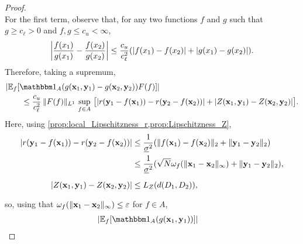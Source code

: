 \documentclass[12pt]{report}
\begin{document}
\begin{proof}
\begin{equation}
    \end{equation}
    For the first term, observe that, for any two functions $f$ and $g$ such that $g \ge c_\ell > 0$ and $f, g \le c_u < \infty$,
    \begin{equation}
        \abs*{
            \frac{f(x_1)}{g(x_1)}
            -
            \frac{f(x_2)}{g(x_2)}
        }
        \le \frac{c_u}{c_\ell^2}\parens*{
            \abs{f(x_1) - f(x_2)}
            + \abs{g(x_1) - g(x_2)}
        }.
    \end{equation}
    Therefore, taking a supremum,
    \begin{align}
        &\abs{\E_f\sbrac{
            \ind_A\parens{
                g(\vx_1, \vy_1)
                - g(\vx_2, \vy_2)
            }
            F(f)
        }} \\
        &\qquad\le 
            \frac{c_u}{c_\ell^2}
            \,
            \norm{F(f)}_{L^1}
            \,
            \sup_{f \in A}
            \,\big[
                \abs{
                    r(\vy_1 - f(\vx_1))
                    - r(\vy_2 - f(\vx_2))
                }
                + \abs{Z(\vx_1, \vy_1) - Z(\vx_2, \vy_2)}
            \big]. \nonumber
    \end{align}
    Here, using \cref{prop:local_Lipschitzness_r,prop:Lipschitzness_Z},
    \begin{align}
        \abs{
            r(\vy_1 - f(\vx_1))
            - r(\vy_2 - f(\vx_2))
        }
        &\le \frac{1}{\underline{\sigma}^2}(
            \norm{f(\vx_1) - f(\vx_2)}_2
            + \norm{\vy_1 - \vy_2}_2
        ) \\
        &\le \frac{1}{\underline{\sigma}^2}(
            \sqrt{N}\omega_f(\norm{\vx_1 - \vx_2}_\infty)
            + \norm{\vy_1 - \vy_2}_2
        ), \\
        \abs{Z(\vx_1, \vy_1) - Z(\vx_2, \vy_2)}
        &\le \vphantom{\frac{1}{}} L_Z(d(D_1, D_2)),
    \end{align}
    so, using that $\omega_f(\lVert\mathbf{x}_1 - \mathbf{x}_2\rVert_\infty) \le \varepsilon$ for $f \in A$,
    \begin{align}
        &\abs{\E_f\sbrac{
            \ind_A\parens{
                g(\vx_1, \vy_1)
}}}
\end{align}
\end{proof}
\end{document}
